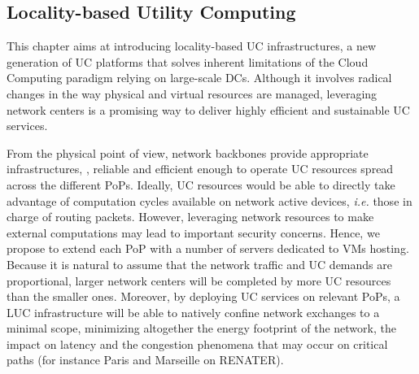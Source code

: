 
\subsection{Locality-based Utility Computing}



This chapter aims at introducing locality-based UC infrastructures, a new generation of UC
platforms that solves inherent limitations of the Cloud Computing paradigm relying on
large-scale DCs. Although it involves radical changes in the way physical and virtual
resources are managed, leveraging network centers is a promising way to deliver highly
efficient and sustainable UC services.

From the physical point of view, network backbones 
provide appropriate infrastructures, \ie, reliable and efficient enough to operate UC
resources spread across the different PoPs. Ideally, UC resources would be able to
directly take advantage of computation cycles available on network active devices,
\textit{i.e.} those in charge of routing packets. However, leveraging network resources to
make external computations may lead to important security concerns. Hence, we propose to
extend each PoP with a number of servers dedicated to VMs hosting. Because it is natural
to assume that the network traffic and UC demands are proportional, larger network centers
will be completed by more UC resources than the smaller ones. Moreover, by deploying UC
services on relevant PoPs, a LUC infrastructure will be able to natively confine network
exchanges to a minimal scope, minimizing altogether the energy footprint of the network, the
impact on latency and the congestion phenomena that may occur on critical paths (for
instance Paris and Marseille on RENATER).

